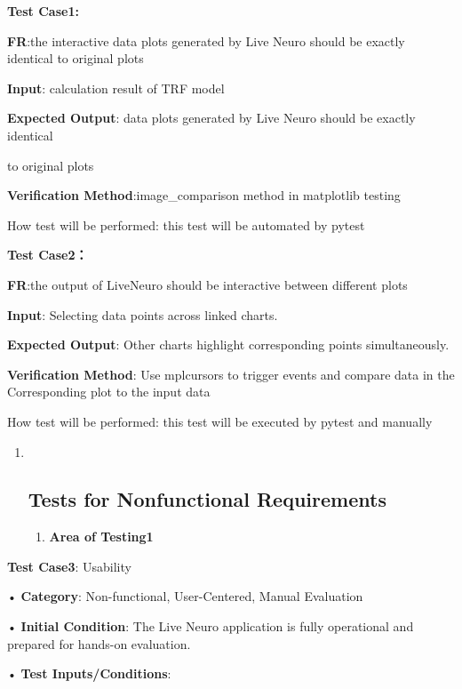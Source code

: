\documentclass[
]{article}
\begin{document}
\textbf{Test Case1:}

\textbf{FR}:the interactive data plots generated by Live Neuro should be
exactly identical to original plots

\textbf{Input}: calculation result of TRF model

\textbf{Expected Output}: data plots generated by Live Neuro should be
exactly identical

to original plots

\textbf{Verification Method}:image\_comparison method in matplotlib
testing

How test will be performed: this test will be automated by pytest

\textbf{Test Case2：}

\textbf{FR}:the output of LiveNeuro should be interactive between
different plots

\textbf{Input}: Selecting data points across linked charts.

\textbf{Expected Output}: Other charts highlight corresponding points
simultaneously.

\textbf{Verification Method}: Use mplcursors to trigger events and
compare data in the Corresponding plot to the input data

How test will be performed: this test will be executed by pytest and
manually

\begin{enumerate}
\def\labelenumi{\arabic{enumi}.}
\setcounter{enumi}{1}
\item ~
  \hypertarget{tests-for-nonfunctional-requirements}{%
  \subsection{Tests for Nonfunctional
  Requirements}\label{tests-for-nonfunctional-requirements}}

  \begin{enumerate}
  \def\labelenumii{\arabic{enumii}.}
  \item
    \textbf{Area of Testing1}
  \end{enumerate}
\end{enumerate}

\textbf{Test Case3}: Usability

• \textbf{Category}: Non-functional, User-Centered, Manual Evaluation

• \textbf{Initial Condition}: The Live Neuro application is fully
operational and prepared for hands-on evaluation.

• \textbf{Test Inputs/Conditions}:
\end{document}
